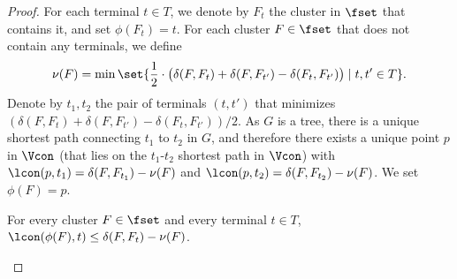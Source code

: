 \begin{proof}
For each terminal $t\in T$, we denote by $F_t$ the cluster in $\fset$ that contains it, and set $\phi(F_t)=t$.
For each cluster $F\in \fset$ that does not contain any terminals, we define \[\nu(F)=\min\set{\frac{1}{2}\cdot \big(\delta(F,F_t)+\delta(F,F_{t'})-\delta(F_t,F_{t'})\big)\mid t,t'\in T}.\]
Denote by $t_1,t_2$ the pair of terminals $(t,t')$ that minimizes $(\delta(F,F_t)+\delta(F,F_{t'})-\delta(F_t,F_{t'}))/2$.
As $G$ is a tree, there is a unique shortest path connecting $t_1$ to $t_2$ in $G$, and therefore there exists a unique point $p$ in $\Vcon$ (that lies on the $t_1$-$t_2$ shortest path in $\Vcon$) with $\lcon(p,t_1)=\delta(F,F_{t_1})-\nu(F)$ and $\lcon(p,t_2)=\delta(F,F_{t_2})-\nu(F)$. We set $\phi(F)=p$.
	

 

\begin{claim} \label{clm:t-proj}
For every cluster $F\in \fset$ and every terminal $t\in T$, $\lcon(\phi(F),t) \le \delta(F,F_t) - \nu(F)$. 
\end{claim}


\end{proof}
